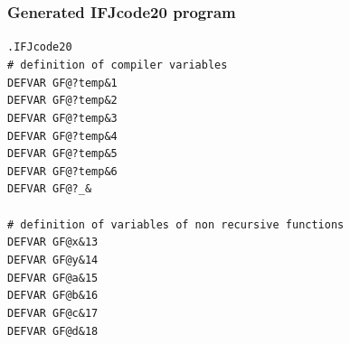 \documentclass[12pt]{article}
\begin{document}
\begin{figure}
\subsubsection{Generated IFJcode20 program}
\texttt{.IFJcode20
\\
\textcolor{comment}{\# definition of compiler variables}\\
DEFVAR GF@?temp\&1\\
DEFVAR GF@?temp\&2\\
DEFVAR GF@?temp\&3\\
DEFVAR GF@?temp\&4\\
DEFVAR GF@?temp\&5\\
DEFVAR GF@?temp\&6\\
DEFVAR GF@?\_\&\\
\\
\textcolor{comment}{\# definition of variables of non recursive functions}\\
DEFVAR GF@x\&13\\
DEFVAR GF@y\&14\\
DEFVAR GF@a\&15\\
DEFVAR GF@b\&16\\
DEFVAR GF@c\&17\\
DEFVAR GF@d\&18\\
\\}
\end{figure}
\end{document}
